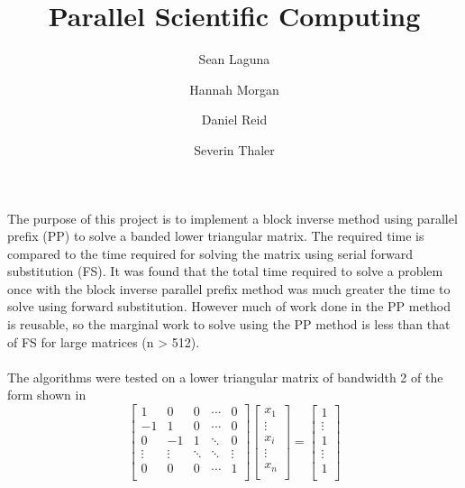 \documentclass[a4paper,12pt]{article}
\title{Parallel Scientific Computing}
\author{Sean Laguna  \\
	\and 
	Hannah Morgan \\
	\and
	Daniel Reid \\
	\and
	Severin Thaler \\
	}
\date{\vspace{-5ex}}
\begin{document}
\maketitle



\paragraph*{}
	The purpose of this project is to implement a block inverse method using parallel prefix (PP) to solve a banded lower triangular matrix.  The required time is compared to the time required for solving the matrix using serial forward substitution (FS).  It was found that the total time required to solve a problem once with the block inverse parallel prefix  method was much greater the time to solve using forward substitution.  However much of work done in the PP method is reusable, so the marginal work to solve using the PP method is less than that of FS for large matrices (n > 512).

\paragraph*{}
	The algorithms were tested on a lower triangular matrix of bandwidth 2 of the form shown in 
	$$
	\begin{bmatrix}
	1 & 0 & 0  &  \cdots & 0  \\
	-1  & 1  & 0&   \cdots & 0 \\
	0 & -1 & 1  & \ddots & 0 \\
	\vdots & \vdots & \ddots  & \ddots & \vdots\\
	 0 & 0 & 0 & \cdots &  1  \\
	\end{bmatrix}
	\begin{bmatrix}
	x_1\\
	\vdots \\
	x_i\\
	\vdots \\
	x_n\\
	\end{bmatrix} = 
	\begin{bmatrix}
	1\\
	\vdots \\
	1\\
	\vdots \\
	1\\
	\end{bmatrix}$$	
	  
\end{document}
